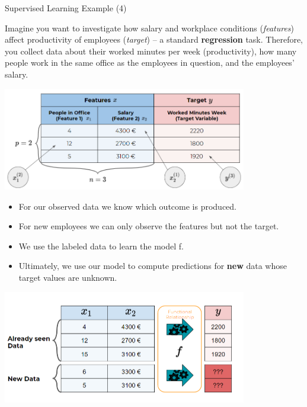\documentclass[11pt,compress,t,notes=noshow, xcolor=table]{beamer}
\begin{document}

\begin{vbframe}{Supervised Learning Example (4)}

Imagine you want to investigate how salary and workplace conditions 
(\emph{features}) affect productivity of employees (\emph{target}) -- a standard 
\textbf{regression} task. Therefore, you collect data about their worked minutes 
per week (productivity), how many people work in the same office as the 
employees in question, and the employees' salary.
  
\begin{center}
  \includegraphics[width = 0.8\textwidth]{figure_man/data_table} 
\end{center}

\framebreak

\begin{itemize}

  \item For our observed data we know which outcome is produced.
  
  \item For new employees we can only observe the features but not the target.

  \item We use the labeled data to learn the model f.

  \item Ultimately, we use our model to compute predictions for 
  \textbf{new} data whose target values are unknown.
  
\end{itemize}

\begin{center}
  \includegraphics[width=0.8\textwidth]{figure_man/what_is_a_model_web} 
\end{center}

\end{vbframe}
\end{document}
